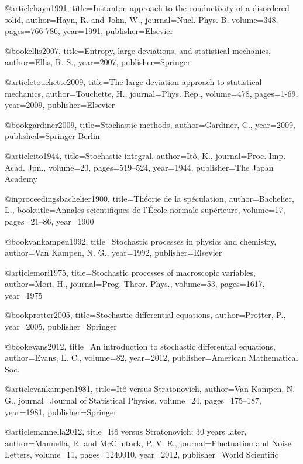 @article{hayn1991,
  title={Instanton approach to the conductivity of a disordered solid},
  author={Hayn, R. and John, W.},
  journal={Nucl. Phys. B},
  volume={348},
  pages={766-786},
  year={1991},
  publisher={Elsevier}
}

@book{ellis2007,
  title={Entropy, large deviations, and statistical mechanics},
  author={Ellis, R. S.},
  year={2007},
  publisher={Springer}
}

@article{touchette2009,
  title={The large deviation approach to statistical mechanics},
  author={Touchette, H.},
  journal={Phys. Rep.},
  volume={478},
  pages={1-69},
  year={2009},
  publisher={Elsevier}
}


@book{gardiner2009,
  title={Stochastic methods},
  author={Gardiner, C.},
  year={2009},
  published={Springer Berlin}
  }

@article{ito1944,
  title={Stochastic integral},
  author={It{\^o}, K.},
  journal={Proc. Imp. Acad. Jpn.},
  volume={20},
  pages={519--524},
  year={1944},
  publisher={The Japan Academy}
}

@inproceedings{bachelier1900,
  title={Th{\'e}orie de la sp{\'e}culation},
  author={Bachelier, L.},
  booktitle={Annales scientifiques de l'{\'E}cole normale sup{\'e}rieure},
  volume={17},
  pages={21--86},
  year={1900}
}

@book{vankampen1992,
  title={Stochastic processes in physics and chemistry},
  author={Van Kampen, N. G.},
  year={1992},
  publisher={Elsevier}
}

@article{mori1975,
  title={Stochastic processes of macroscopic variables},
  author={Mori, H.},
  journal={Prog. Theor. Phys.},
  volume={53},
  pages={1617},
  year={1975}
}

@book{protter2005,
  title={Stochastic differential equations},
  author={Protter, P.},
  year={2005},
  publisher={Springer}
}

@book{evans2012,
  title={An introduction to stochastic differential equations},
  author={Evans, L. C.},
  volume={82},
  year={2012},
  publisher={American Mathematical Soc.}
}

@article{vankampen1981,
  title={{It{\^o} versus Stratonovich}},
  author={Van Kampen, N. G.},
  journal={Journal of Statistical Physics},
  volume={24},
  pages={175--187},
  year={1981},
  publisher={Springer}
}

@article{mannella2012,
  title={It{\^o} versus Stratonovich: 30 years later},
  author={Mannella, R. and McClintock, P. V. E.},
  journal={Fluctuation and Noise Letters},
  volume={11},
  pages={1240010},
  year={2012},
  publisher={World Scientific}
}


